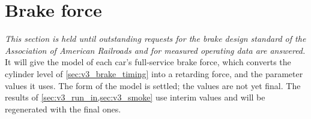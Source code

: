 \section{Brake force}
\label{sec:v3_brake_force}

%

\emph{This section is held until outstanding requests for the brake design standard of the Association of American Railroads and for measured operating data are answered.} It will give the model of each car's full-service brake force, which converts the cylinder level of \cref{sec:v3_brake_timing} into a retarding force, and the parameter values it uses. The form of the model is settled; the values are not yet final. The results of \cref{sec:v3_run_in,sec:v3_smoke} use interim values and will be regenerated with the final ones.

